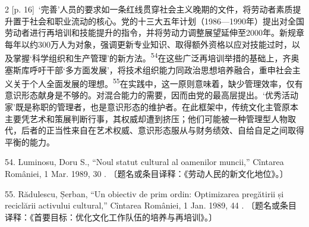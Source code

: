 \documentclass[10pt,a4paper]{article}
\begin{document}
\begin{paracol}{2}
{\scriptsize\color{gray} [p. 16]}\ ‘完善’人员的要求如一条红线贯穿社会主义晚期的文件，将劳动者素质提升置于社会和职业流动的核心。党的十三大五年计划（1986—1990年）提出对全国劳动者进行再培训和技能提升的指令，并将劳动力调整展望延伸至2000年。新规章每年以约300万人为对象，强调更新专业知识、取得额外资格以应对技能过时，以及掌握‘科学组织和生产管理’的新方\mbox{法。\textsuperscript{54}}在这些广泛再培训举措的基础上，齐奥塞斯库呼吁干部‘多方面发展’，将技术组织能力同政治思想培养融合，重申社会主义关于个人全面发展的理\mbox{想。\textsuperscript{55}}在实践中，这一原则意味着，缺少管理效率，仅有意识形态献身是不够的。对混合能力的需要，因而由党的最高层提出。‘优秀活动家’既是称职的管理者，也是意识形态的维护者。在此框架中，传统文化主管原本主要凭艺术和策展判断行事，其权威却遭到挤压；他们可能被一种管理型人物取代，后者的正当性来自在艺术权威、意识形态服从与财务绩效、自给自足之间取得平衡的能力。\par{\small 54. Luminosu, Doru S., “Noul statut cultural al oamenilor muncii,” Cîntarea României, 1 Mar. 1989, 30 . 〔题名或条目译释：《劳动人民的新文化地位》。〕\par}{\small 55. Rădulescu, Șerban, “Un obiectiv de prim ordin: Optimizarea pregătirii și reciclării activului cultural,” Cîntarea României, 1 Jan. 1989, 44 . 〔题名或条目译释：《首要目标：优化文化工作队伍的培养与再培训》。〕\par}
\switchcolumn

\end{paracol}
\end{document}
